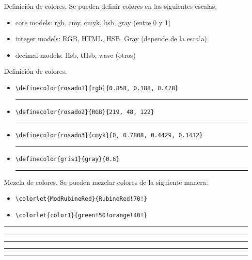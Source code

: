 \documentclass[dvipsnames,xcolor=x11names]{beamer}
\theoremstyle{plain}
\theoremstyle{definition}
\begin{document}
\begin{frame}[fragile]{Definición de colores.}
    Se pueden definir colores en las siguientes escalas:
    \begin{itemize}
        \item core models: rgb, cmy, cmyk, hsb, gray (entre 0 y 1)
        \item integer models: RGB, HTML, HSB, Gray (depende de la escala)
        \item decimal models: Hsb, tHsb, wave (otros)
    \end{itemize}

\end{frame}
\begin{frame}[fragile]{Definición de colores.}
    \begin{small}
    \begin{itemize}
        \item \verb!\definecolor{rosado1}{rgb}{0.858, 0.188, 0.478}!  {\color{rosado1}\rule{\linewidth}{1mm}}
        
        \item \verb!\definecolor{rosado2}{RGB}{219, 48, 122}!
        {\color{rosado2}\rule{\linewidth}{1mm}}
        \item \verb!\definecolor{rosado3}{cmyk}{0, 0.7808, 0.4429, 0.1412}!
        {\color{rosado3}\rule{\linewidth}{1mm}}
        \item \verb!\definecolor{gris1}{gray}{0.6}!
        {\color{gris1}\rule{\linewidth}{1mm}}
    \end{itemize}
\end{small}
\end{frame}

\begin{frame}[fragile]{Mezcla de colores.}
    Se pueden mezclar colores de la siguiente manera:
    
    \begin{itemize}
        \item \verb~\colorlet{ModRubineRed}{RubineRed!70!}~
        \item \verb~\colorlet{color1}{green!50!orange!40!}~
    \end{itemize}
    
    {\color{RubineRed} \rule{\linewidth}{1mm} }
    {\color{ModRubineRed} \rule{\linewidth}{1mm} }
    {\color{green!70} \rule{\linewidth}{1mm} }
    {\color{orange!70} \rule{\linewidth}{1mm} }
    {\color{color1} \rule{\linewidth}{1mm} }
\end{frame}
\end{document}
